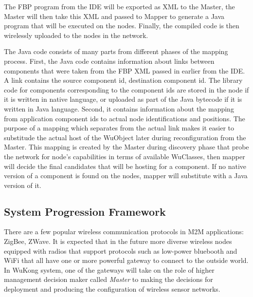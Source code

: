 The FBP program from the IDE will be exported as XML to the Master, the Master
will then take this XML and passed to Mapper to generate a Java program that
will be executed on the nodes. Finally, the compiled code is then wirelessly
uploaded to the nodes in the network.

The Java code consists of many parts from different phases of the mapping process.
First, the Java code contains information about links between components that
were taken from the FBP XML passed in earlier from the IDE. A link contains the
source component id, destination component id. The library code for components
corresponding to the component ids are stored in the node if it is written in
native language, or uploaded as part of the Java bytecode if it is written in
Java language. Second, it contains information about the mapping from
application component ids to actual node identifications and positions. The
purpose of a mapping which separates from the actual link makes it easier to
substitude the actual host of the WuObject later during
reconfiguration from the Master. This mapping is created by the Master during
discovery phase that probe the network for node's capabilities in terms of
available WuClasses, then mapper will decide the final candidates that will be
hosting for a component. If no native version of a component is found on the
nodes, mapper will substitute with a Java version of it.

\subsection{System Progression Framework}

There are a few popular wireless communication protocols in M2M applications:
ZigBee, ZWave. It is expected that in the future more diverse
wireless nodes equipped with radios that support protocols such as low-power
bluebooth and WiFi that all have one or more powerful gateway to connect to the
outside world. In WuKong system, one of the gateways will take on the role of
higher management decision maker called \emph{Master} to making the decisions for
deployment and producing the configuration of wireless sensor networks.

